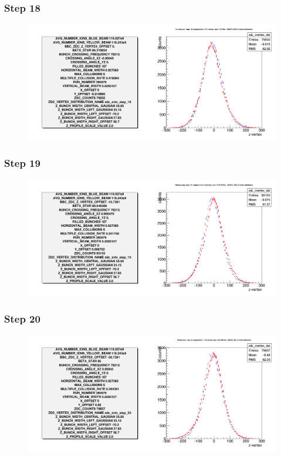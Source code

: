 \begin{frame}
  \frametitle{Step 18}
  \begin{figure}
    \includegraphics[width=\linewidth]{"./figures/tuned_simulation_step_18"}
    \caption{}
    \label{fig:step_18}
  \end{figure}
\end{frame}

\begin{frame}
  \frametitle{Step 19}
  \begin{figure}
    \includegraphics[width=\linewidth]{"./figures/tuned_simulation_step_19"}
    \caption{}
    \label{fig:step_19}
  \end{figure}
\end{frame}

\begin{frame}
  \frametitle{Step 20}
  \begin{figure}
    \includegraphics[width=\linewidth]{"./figures/tuned_simulation_step_20"}
    \caption{}
    \label{fig:step_20}
  \end{figure}
\end{frame}

